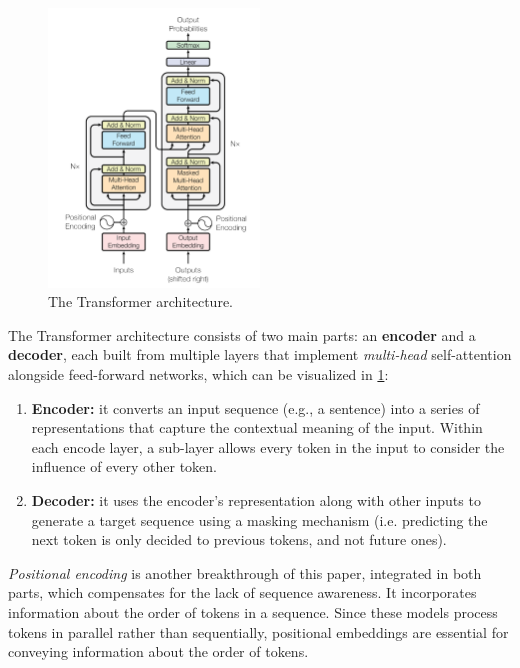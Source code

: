 \begin{figure}[t]
    \centering
    \includegraphics[width=0.5\textwidth]{images/transfomer-architecture.png}
    \caption{The Transformer architecture.}
    \label{fig:transfomer}
\end{figure}

The Transformer architecture consists of two main parts: an \textbf{encoder} and a \textbf{decoder}, each built from multiple layers that implement \textit{multi-head} self-attention alongside feed-forward networks, which can be visualized in \ref{fig:transfomer}:

\begin{enumerate}
    \item \textbf{Encoder:} it converts an input sequence (e.g., a sentence) into a series of representations that capture the contextual meaning of the input. Within each encode layer, a sub-layer allows every token in the input to consider the influence of every other token.
    \item \textbf{Decoder:} it uses the encoder’s representation along with other inputs to generate a target sequence using a masking mechanism (i.e. predicting the next token is only decided to previous tokens, and not future ones).
\end{enumerate}

\textit{Positional encoding} is another breakthrough of this paper, integrated in both parts, which compensates for the lack of sequence awareness. It incorporates information about the order of tokens in a sequence. Since these models process tokens in parallel rather than sequentially, positional embeddings are essential for conveying information about the order of tokens.

